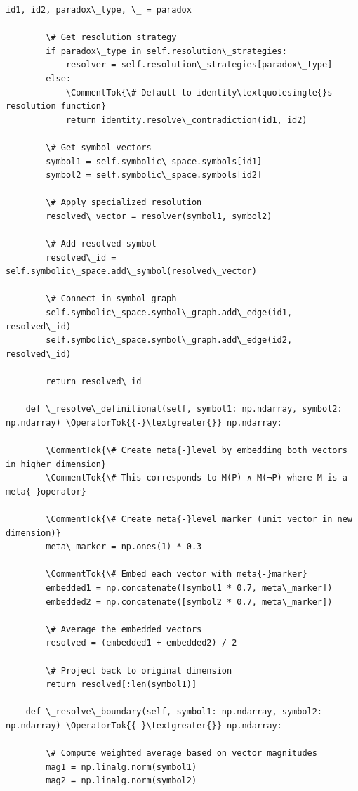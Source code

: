 \documentclass[12pt]{article}
\begin{document}
\begin{lstlisting}[basicstyle=\ttfamily\small]
        id1, id2, paradox\_type, \_ = paradox
        
        \# Get resolution strategy
        if paradox\_type in self.resolution\_strategies:
            resolver = self.resolution\_strategies[paradox\_type]
        else:
            \CommentTok{\# Default to identity\textquotesingle{}s resolution function}
            return identity.resolve\_contradiction(id1, id2)
        
        \# Get symbol vectors
        symbol1 = self.symbolic\_space.symbols[id1]
        symbol2 = self.symbolic\_space.symbols[id2]
        
        \# Apply specialized resolution
        resolved\_vector = resolver(symbol1, symbol2)
        
        \# Add resolved symbol
        resolved\_id = self.symbolic\_space.add\_symbol(resolved\_vector)
        
        \# Connect in symbol graph
        self.symbolic\_space.symbol\_graph.add\_edge(id1, resolved\_id)
        self.symbolic\_space.symbol\_graph.add\_edge(id2, resolved\_id)
        
        return resolved\_id
    
    def \_resolve\_definitional(self, symbol1: np.ndarray, symbol2: np.ndarray) \OperatorTok{{-}\textgreater{}} np.ndarray:
        
        \CommentTok{\# Create meta{-}level by embedding both vectors in higher dimension}
        \CommentTok{\# This corresponds to M(P) ∧ M(¬P) where M is a meta{-}operator}
        
        \CommentTok{\# Create meta{-}level marker (unit vector in new dimension)}
        meta\_marker = np.ones(1) * 0.3
        
        \CommentTok{\# Embed each vector with meta{-}marker}
        embedded1 = np.concatenate([symbol1 * 0.7, meta\_marker])
        embedded2 = np.concatenate([symbol2 * 0.7, meta\_marker])
        
        \# Average the embedded vectors
        resolved = (embedded1 + embedded2) / 2
        
        \# Project back to original dimension
        return resolved[:len(symbol1)]
    
    def \_resolve\_boundary(self, symbol1: np.ndarray, symbol2: np.ndarray) \OperatorTok{{-}\textgreater{}} np.ndarray:
       
        \# Compute weighted average based on vector magnitudes
        mag1 = np.linalg.norm(symbol1)
        mag2 = np.linalg.norm(symbol2)
        

\end{lstlisting}
\end{document}
